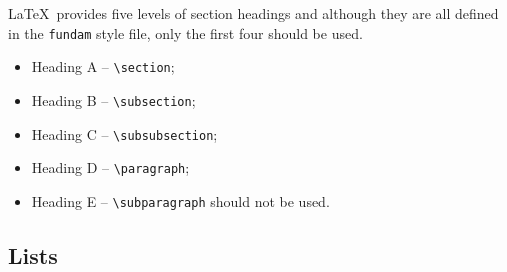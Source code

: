 \documentclass{fundam}
\begin{document}
\LaTeX\ provides five levels of section headings and although
they are all defined
in the \texttt{fundam} style file, only the first four should be used.
\begin{itemize}
  \item Heading A -- \verb"\section";
  \item Heading B -- \verb"\subsection";
  \item Heading C -- \verb"\subsubsection";
  \item Heading D -- \verb"\paragraph";
  \item Heading E -- \verb"\subparagraph" should not be used.
\end{itemize}


\subsection{Lists}
\end{document}
